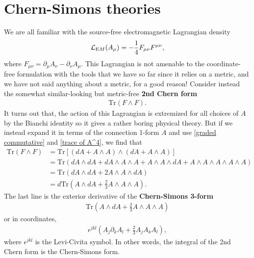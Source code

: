 \documentclass[aps,nofootinbib]{revtex4}
\makeatletter
\newcommand\Tr{\mathrm{Tr}}
\newenvironment{chapquote}[2][2em]
  {\setlength{\@tempdima}{#1}%
   \def\chapquote@author{#2}%
   \parshape 1 \@tempdima \dimexpr\textwidth-2\@tempdima\relax%
   \itshape}
  {\par\normalfont\hfill---\ \chapquote@author\hspace*{\@tempdima}\par\bigskip}
\makeatother
\begin{document}
\section{Chern-Simons theories}\label{chern-simons}

We are all familiar with the source-free electromagnetic Lagrangian density
\begin{align*}
\mathcal{L}_{\text EM} (A_{\mu}) = -\frac{1}{4} F_{\mu \nu} F^{\mu \nu}, 
\end{align*}
where $F_{\mu \nu} = \partial_{\mu} A_{\nu} - \partial_{\nu} A_{\mu}$. This Lagrangian is not amenable to the coordinate-free formulation with the tools that we have so far since it relies on a metric, and we have not said anything about a metric, for a good reason! Consider instead the somewhat similar-looking but metric-free {\bf 2nd Chern form}
\begin{align*}
\Tr (F \wedge F).
\end{align*}
It turns out that, the action of this Lagrangian is extremized for all choices of $A$ by the Bianchi identity \cite{Baez94} so it gives a rather boring physical theory. But if we  instead expand it in terms of the connection 1-form $A$ and use \eqref{graded commutative} and \eqref{trace of A^4}, we find that
\begin{align*}
\Tr (F \wedge F) &= \Tr \left[ (dA + A \wedge A) \wedge (dA + A \wedge A) \right] \\
	&= \Tr (dA \wedge dA + dA \wedge A \wedge A + A \wedge A \wedge dA + A \wedge A \wedge A \wedge A \wedge A) \\
    &= \Tr (dA \wedge dA + 2A \wedge A \wedge dA) \\
    &= d\Tr (A \wedge dA + \frac{2}{3} A \wedge A \wedge A).
\end{align*}
The last line is the exterior derivative of the {\bf Chern-Simons 3-form} 
\begin{align}
\boxed{\Tr (A \wedge dA + \frac{2}{3} A \wedge A \wedge A)}
\end{align}
or in coordinates,
\begin{align}
\epsilon^{j k l} (A_j \partial_k A_l + \frac{2}{3} A_j A_k A_l), 
\end{align}
where $\epsilon^{jkl}$ is the Levi-Civita symbol. In other words, the integral of the 2nd Chern form is the Chern-Simons form.
\end{document}
